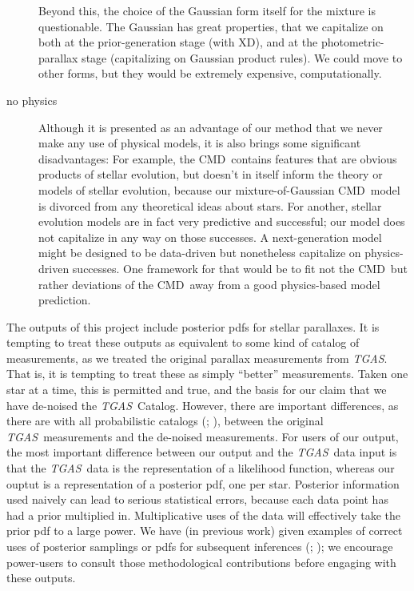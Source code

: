 \documentclass[modern]{aastex61}
\newcommand{\acronym}[1]{{\small{#1}}}
\newcommand{\project}[1]{\textsl{#1}}
\newcommand{\tgas}{\project{\acronym{TGAS}}}
\newcommand{\xd}{\acronym{XD}}
\newcommand{\cmd}{\acronym{CMD}}
\begin{document}
\begin{description}
  Beyond this, the choice of the Gaussian form itself for the mixture is
  questionable. The Gaussian has great properties, that we capitalize on
  both at the prior-generation stage (with \xd), and at the photometric-parallax
  stage (capitalizing on Gaussian product rules). We could move to other
  forms, but they would be extremely expensive, computationally.
\item[no physics] Although it is presented as an advantage of our
  method that we never make any use of physical models, it is also
  brings some significant disadvantages: For example, the \cmd\ contains
  features that are obvious products of stellar evolution, but doesn't in
  itself inform the theory or models of stellar evolution, because our
  mixture-of-Gaussian \cmd\ model is divorced from any theoretical ideas
  about stars. For another, stellar evolution models are in fact very
  predictive and successful; our model does not capitalize in any way on
  those successes. A next-generation model might be designed to be data-driven
  but nonetheless capitalize on physics-driven successes. One framework
  for that would be to fit not the \cmd\ but rather deviations of the \cmd\ away
  from a good physics-based model prediction.
\end{description}



The outputs of this project include posterior pdfs for stellar parallaxes.
It is tempting to treat these outputs as equivalent to some kind of catalog of
measurements, as we treated the original parallax measurements from \tgas.
That is, it is tempting to treat these as simply ``better'' measurements.
Taken one star at a time, this is permitted and true, and the basis for our
claim that we have de-noised the \tgas\ Catalog.
However, there are important differences, as there are with all
probabilistic catalogs (\citealt{hogg11}; \citealt{portillo17}), between the
original \tgas\ measurements and the de-noised measurements.
For users of our output, the most important difference between our
output and the \tgas\ data input is that the \tgas\ data is the representation
of a likelihood function, whereas our ouptut is a
representation of a posterior pdf, one per star.
Posterior information used naively can lead to serious statistical
errors, because each data point has had a prior multiplied in.
Multiplicative uses of the data will effectively take the prior
pdf to a large power.
We have (in previous work)
given examples of correct uses of posterior samplings or pdfs
for subsequent inferences (\citealt{hogg08}; \citealt{dfm14}); we
encourage power-users to consult those methodological
contributions before engaging with these outputs.
\end{document}
